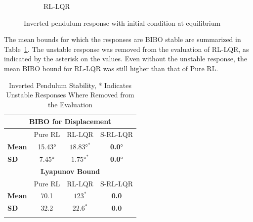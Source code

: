 \begin{figure}[tb]
\begin{subfigure}[b]{0.49\textwidth}
      \caption{RL-LQR}
      \label{subfig_chap3:invpend_at_equil_resp_300000steps_RL_LQR}
  \end{subfigure}
  \caption{Inverted pendulum response with initial condition at equilibrium}
  \label{fig_chap3:invpend_at_equil_resp_300000steps}
\end{figure}
%
The mean bounds for which the responses are BIBO stable are summarized in Table~\ref{table:invpend_near_stablility}. The unstable response was removed from the evaluation of RL-LQR, as indicated by the asterisk on the values. Even without the unstable response, the mean BIBO bound for RL-LQR was still higher than that of Pure RL.
\begin{table}[tb]
  \begin{center}
    \setlength{\tabcolsep}{6pt}
    \caption{Inverted Pendulum Stability, * Indicates Unstable Responses Where Removed from the Evaluation}
    \begin{tabular}{ l c c c }
    \hline\hline
    \multicolumn{4}{c}{\textbf{BIBO for Displacement}}\\
    \hline
    & Pure RL & RL-LQR & S-RL-LQR\\
    \hline
    \textbf{Mean} & 15.43\si{\degree} & $18.83\si{\degree}^*$ & \textbf{0.0}\si{\degree}\\
    \textbf{SD}  & 7.45\si{\degree} & $1.75\si{\degree}^*$ & \textbf{0.0}\si{\degree}\\
    \hline
    \multicolumn{4}{c}{\textbf{Lyapunov Bound}}\\
    \hline
    & Pure RL & RL-LQR & S-RL-LQR\\
    \hline
    \textbf{Mean} & 70.1 & $123^*$ & \textbf{0.0}\\
    \textbf{SD}  & 32.2 & $22.6^*$ & \textbf{0.0}\\
    \hline
    \label{table:invpend_near_stablility}
    \end{tabular}
    \end{center}
  \end{table}

